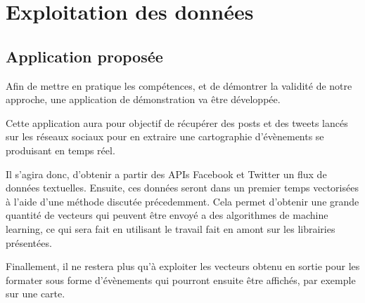 \chapter{Exploitation des données}

\section{Application proposée}

Afin de mettre en pratique les compétences, et de démontrer la validité de notre approche, une application de démonstration va être développée.

Cette application aura pour objectif de récupérer des posts et des tweets lancés sur les réseaux sociaux pour en extraire une cartographie d'évènements se produisant en temps réel.

Il s'agira donc,  d'obtenir a partir des APIs Facebook et Twitter un flux de données textuelles. Ensuite, ces données seront dans un premier temps vectorisées à l'aide d'une méthode discutée précedemment. Cela permet d'obtenir une grande quantité de vecteurs qui peuvent être envoyé a des algorithmes de machine learning, ce qui sera fait en utilisant le travail fait en amont sur les librairies présentées.

Finallement, il ne restera plus qu'à exploiter les vecteurs obtenu en sortie pour les formater sous forme d'évènements qui pourront ensuite être affichés, par exemple sur une carte.
